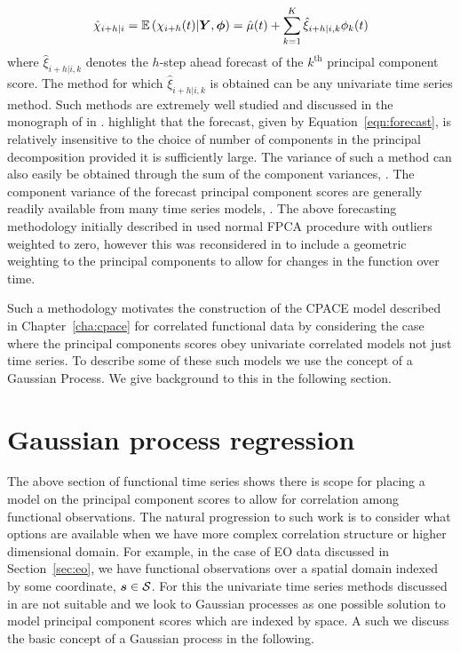 \begin{equation}\label{eqn:forecast}
	\hat{\chi}_{i+h | i} = \operatorname{\mathbb{E}}\left(\chi_{i+h}(t) | \bm{{Y}}, \bm{{\phi}}\right) = \hat{\mu}(t) + \sum_{k=1}^K \hat{\xi}_{i+h | i, k} \phi_k(t) 
\end{equation}
where $\hat{\xi}_{i+h | i, k}$ denotes the $h$-step ahead forecast of the $k^\text{th}$ principal component score.
The method for which $\hat{\xi}_{i+h | i, k}$ is obtained can be any univariate time series method. Such methods are extremely well studied and discussed in the monograph of \citeauthor{hyndman_forecasting_2018} in \citep{hyndman_forecasting_2018}.
\citeauthor{hyndman_stochastic_2008} highlight that the forecast, given by Equation~\eqref{eqn:forecast}, is relatively insensitive to the choice of number of components in the principal decomposition provided it is sufficiently large.
The variance of such a method can also easily be obtained through the sum of the component variances, \citep{hyndman_stochastic_2008}.
The component variance of the forecast principal component scores are generally readily available from many time series models, \citep{hyndman_forecasting_2018}. 
The above forecasting methodology initially described in \citep{hyndman_robust_2007} used normal FPCA procedure with outliers weighted to zero, however this was reconsidered in \citep{hyndman_forecasting_2009} to include a geometric weighting to the principal components to allow for changes in the function over time. 

Such a methodology motivates the construction of the CPACE model described in Chapter~\ref{cha:cpace} for correlated functional data by considering the case where the principal components scores obey univariate correlated models not just time series. To describe some of these such models we use the concept of a Gaussian Process. We give background to this in the following section. 

\section{Gaussian process regression \label{sec:gp}}
The above section of functional time series shows there is scope for placing a model on the principal component scores to allow for correlation among functional observations.
The natural progression to such work is to consider what options are available when we have more complex correlation structure or higher dimensional domain. 
For example, in the case of EO data discussed in Section~\ref{sec:eo}, we have functional observations over a spatial domain indexed by some coordinate, $\bm{{s}} \in \mathcal{S}$.
For this the univariate time series methods discussed in \citep{hyndman_forecasting_2009} are not suitable and we look to Gaussian processes as one possible solution to model principal component scores which are indexed by space.
A such we discuss the basic concept of a Gaussian process in the following. 

